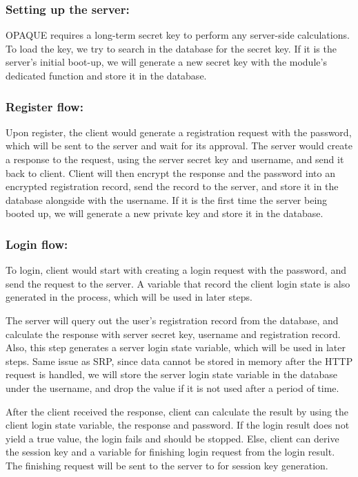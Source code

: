 \subsubsection{Setting up the server:}
OPAQUE requires a long-term secret key to perform any server-side calculations.
To load the key, we try to search in the database for the secret key.
If it is the server's initial boot-up, we will generate a new secret key with the module's dedicated function and store it in the database.

\subsubsection{Register flow:}
Upon register, the client would generate a registration request with the password, which will be sent to the server and wait for its approval.
The server would create a response to the request, using the server secret key and username, and send it back to client.
Client will then encrypt the response and the password into an encrypted registration record, send the record to the server, and store it in the database alongside with the username.
If it is the first time the server being booted up, we will generate a new private key and store it in the database.

\subsubsection{Login flow:}
To login, client would start with creating a login request with the password, and send the request to the server.
A variable that record the client login state is also generated in the process, which will be used in later steps.

The server will query out the user's registration record from the database, and calculate the response with server secret key, username and registration record.
Also, this step generates a server login state variable, which will be used in later steps.
Same issue as SRP, since data cannot be stored in memory after the HTTP request is handled, we will store the server login state variable in the database under the username, and drop the value if it is not used after a period of time.

After the client received the response, client can calculate the result by using the client login state variable, the response and password.
If the login result does not yield a true value, the login fails and should be stopped.
Else, client can derive the session key and a variable for finishing login request from the login result.
The finishing request will be sent to the server to for session key generation.

